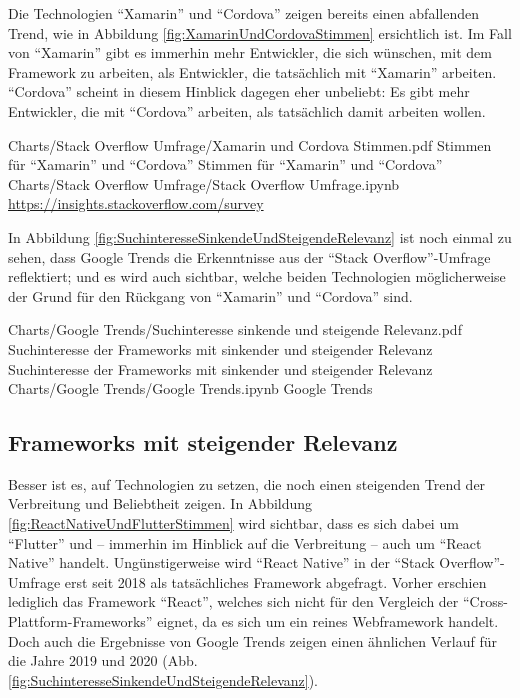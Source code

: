 Die Technologien \enquote{Xamarin} und \enquote{Cordova} zeigen bereits einen abfallenden Trend, wie in Abbildung \ref{fig:XamarinUndCordovaStimmen} ersichtlich ist.
Im Fall von \enquote{Xamarin} gibt es immerhin mehr Entwickler, die sich wünschen, mit dem Framework zu arbeiten, als Entwickler, die tatsächlich mit \enquote{Xamarin} arbeiten.
\enquote{Cordova} scheint in diesem Hinblick dagegen eher unbeliebt: Es gibt mehr Entwickler, die mit \enquote{Cordova} arbeiten, als tatsächlich damit arbeiten wollen.

\begin{alexfigurewithnotebook}{Charts/Stack Overflow Umfrage/Xamarin und Cordova Stimmen.pdf}
	{Stimmen für \enquote{Xamarin} und \enquote{Cordova}}
	{Stimmen für \enquote{Xamarin} und \enquote{Cordova}}
	{Charts/Stack Overflow Umfrage/Stack Overflow Umfrage.ipynb}
	{\url{https://insights.stackoverflow.com/survey}}
	\label{fig:XamarinUndCordovaStimmen}

\end{alexfigurewithnotebook}

In Abbildung \ref{fig:SuchinteresseSinkendeUndSteigendeRelevanz} ist noch einmal zu sehen, dass Google Trends die Erkenntnisse aus der \enquote{Stack Overflow}-Umfrage reflektiert;
und es wird auch sichtbar, welche beiden Technologien möglicherweise der Grund für den Rückgang von \enquote{Xamarin} und \enquote{Cordova} sind.

\begin{alexfigurewithnotebook}{Charts/Google Trends/Suchinteresse sinkende und steigende Relevanz.pdf}
	{Suchinteresse der Frameworks mit sinkender und steigender Relevanz}
	{Suchinteresse der Frameworks mit sinkender und steigender Relevanz}
	{Charts/Google Trends/Google Trends.ipynb}
	{Google Trends}
	\label{fig:SuchinteresseSinkendeUndSteigendeRelevanz}

\end{alexfigurewithnotebook}

\subsection{Frameworks mit steigender Relevanz}

Besser ist es, auf Technologien zu setzen, die noch einen steigenden Trend der Verbreitung und Beliebtheit zeigen.
In Abbildung \ref{fig:ReactNativeUndFlutterStimmen} wird sichtbar, dass es sich dabei um \enquote{Flutter} und -- immerhin im Hinblick auf die Verbreitung -- auch um \enquote{React Native} handelt.
Ungünstigerweise wird \enquote{React Native} in der \enquote{Stack Overflow}-Umfrage erst seit 2018 als tatsächliches Framework abgefragt.
Vorher erschien lediglich das Framework \enquote{React}, welches sich nicht für den Vergleich der \enquote{Cross-Plattform-Frameworks} eignet, da es sich um ein reines Webframework handelt.
Doch auch die Ergebnisse von Google Trends zeigen einen ähnlichen Verlauf für die Jahre 2019 und 2020 (Abb. \ref{fig:SuchinteresseSinkendeUndSteigendeRelevanz}).

